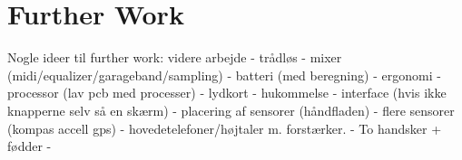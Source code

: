 \chapter{Further Work}
\label{further_work}
Nogle ideer til further work:
videre arbejde - trådløs - mixer (midi/equalizer/garageband/sampling) - batteri (med beregning) - ergonomi -  processor (lav pcb med processer) - lydkort - hukommelse - interface (hvis ikke knapperne selv så en skærm) - placering af sensorer (håndfladen) - flere sensorer (kompas accell gps) - hovedetelefoner/højtaler m. forstærker. - To handsker + fødder -    
